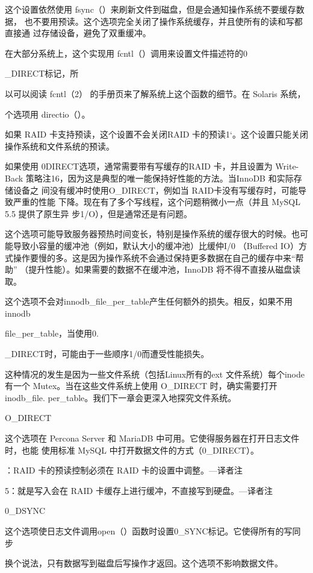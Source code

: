这个设置依然使用 fsync（）来刷新文件到磁盘，但是会通知操作系统不要缓存数据，
也不要用预读。这个选项完全关闭了操作系统缓存，并且使所有的读和写都直接通
过存储设备，避免了双重缓冲。

在大部分系统上，这个实现用 fcntl（）调用来设置文件描述符的0

\_DIRECT标记，所

以可以阅读 fcntl（2） 的手册页来了解系统上这个函数的细节。在 Solaris 系统，

个选项用 directio（）。

如果 RAID 卡支持预读，这个设置不会关闭RAID 卡的预读1‘。这个设置只能关闭
操作系统和文件系统的预读。

如果使用 0DIRECT选项，通常需要带有写缓存的RAID 卡，并且设置为 Write-Back
策略注16，因为这是典型的唯一能保持好性能的方法。当InnoDB 和实际存储设备之
间没有缓冲时使用O\_DIRECT，例如当 RAID卡没有写缓存时，可能导致严重的性能
下降。现在有了多个写线程，这个问题稍微小一点（并且 MySQL 5.5 提供了原生异
步1/O），但是通常还是有问题。

这个选项可能导致服务器预热时间变长，特别是操作系统的缓存很大的时候。也可
能导致小容量的缓冲池（例如，默认大小的缓冲池）比缓仲I/0 （Buffered IO）方
式操作要慢的多。这是因为操作系统不会通过保持更多数据在自己的缓存中来“帮助”
（提升性能）。如果需要的数据不在缓冲池，InnoDB 将不得不直接从磁盘读取。

这个选项不会对innodb\_file\_per\_table产生任何额外的损失。相反，如果不用
innodb

file\_per\_table，当使用0.

\_DIRECT时，可能由于一些顺序1/0而遭受性能损失。

这种情况的发生是因为一些文件系统（包括Linux所有的ext 文件系统）每个inode
有一个 Mutex。当在这些文件系统上使用 O\_DIRECT 时，确实需要打开 inodb\_file.
per\_table。我们下一章会更深入地探究文件系统。

O\_DIRECT

这个选项在 Percona Server 和 MariaDB 中可用。它使得服务器在打开日志文件时，也能
使用标准 MySQL 中打开数据文件的方式（0\_DIRECT）。

：RAID 卡的预读控制必须在 RAID 卡的设置中调整。—译者注

5：就是写入会在 RAID 卡缓存上进行缓冲，不直接写到硬盘。—译者注

0\_DSYNC

这个选项使日志文件调用open（）函数时设置0\_SYNC标记。它使得所有的写同步

换个说法，只有数据写到磁盘后写操作才返回。这个选项不影响数据文件。

